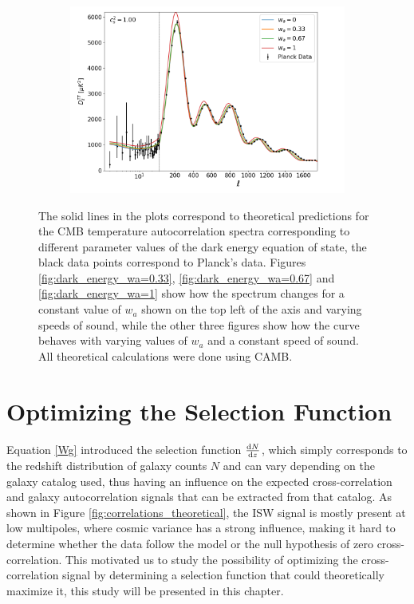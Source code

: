 \documentclass[openany,a4paper,12pt,oneside]{book}
\begin{document}
\begin{spacing}{1.5}
\begin{figure}
{\begin{subfigure}[t]{.43\paperwidth}
		\caption{}
		\label{fig:dark_energy_cs2=0.1}
	\end{subfigure}
	\hfill
	\begin{subfigure}[t]{.43\paperwidth}
		\centering
		\includegraphics[width=\linewidth]{Imagens/full_doublscale_Cs2fixo1.00.png}
		\caption{}
		\label{fig:dark_energy_cs2=1}
	\end{subfigure}
}
\caption{The solid lines in the plots correspond to theoretical predictions for the CMB temperature autocorrelation spectra corresponding to different parameter values of the dark energy equation of state, the black data points correspond to Planck's data\cite{Planck_results}. Figures \ref{fig:dark_energy_wa=0.33}, \ref{fig:dark_energy_wa=0.67} and \ref{fig:dark_energy_wa=1} show how the spectrum changes for a constant value of $w_a$ shown on the top left of the axis and varying speeds of sound, while the other three figures show how the curve behaves with varying values of $w_a$ and a constant speed of sound. All theoretical calculations were done using CAMB.}
\label{fig:Dark_energy_tests}
	
\end{figure}


\chapter{Optimizing the Selection Function}\label{chapter:select_func_optimal}

Equation \eqref{Wg} introduced the selection function $\dv{N}{z}$, which simply corresponds to the redshift distribution of galaxy counts $N$ and can vary depending on the galaxy catalog used, thus having an influence on the expected cross-correlation and galaxy autocorrelation signals that can be extracted from that catalog. As shown in Figure \ref{fig:correlations_theoretical}, the ISW signal is mostly present at low multipoles, where cosmic variance has a strong influence, making it hard to determine whether the data follow the model or the null hypothesis of zero cross-correlation. This motivated us to study the possibility of optimizing the cross-correlation signal by determining a selection function that could theoretically maximize it, this study will be presented in this chapter.


\end{spacing}
\end{document}
